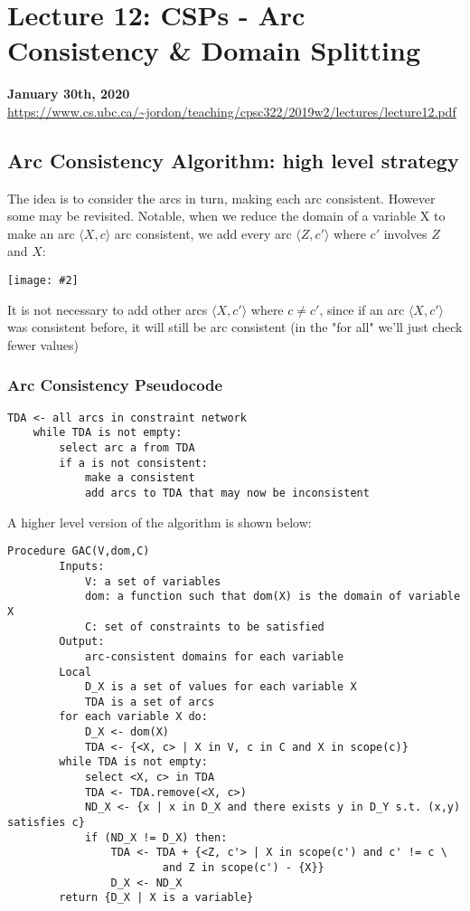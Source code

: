 \documentclass{article}
\theoremstyle{definition}
\newcommand{\centerfig}[2]{\begin{center}\texttt{[image: \#2]}\end{center}}
\begin{document}
\newpage

\section*{Lecture 12: CSPs - Arc Consistency \& Domain Splitting}
\textbf{January 30th, 2020} \\
\url{https://www.cs.ubc.ca/~jordon/teaching/cpsc322/2019w2/lectures/lecture12.pdf}

\subsection*{Arc Consistency Algorithm: high level strategy}
The idea is to consider the arcs in turn, making each arc consistent. However some may be revisited. Notable, when we reduce the domain of a variable X to make an arc $ \langle X, c \rangle $ arc consistent, we add every arc $ \langle Z, c' \rangle $ where $ c' $ involves $ Z $ and $ X $:
\centerfig{0.8}{arc_consistency}
It is not necessary to add other arcs $ \langle X, c' \rangle $ where $ c \ne c' $, since if an arc $ \langle X, c' \rangle $ was consistent before, it will still be arc consistent (in the "for all" we'll just check fewer values)

\subsubsection*{Arc Consistency Pseudocode}
\begin{lstlisting}[tabsize=3]
	TDA <- all arcs in constraint network 
	while TDA is not empty:
		select arc a from TDA
		if a is not consistent:
			make a consistent
			add arcs to TDA that may now be inconsistent
\end{lstlisting}
A higher level version of the algorithm is shown below:

\begin{lstlisting}[tabsize=3]
	Procedure GAC(V,dom,C)
		Inputs:
			V: a set of variables
			dom: a function such that dom(X) is the domain of variable X
			C: set of constraints to be satisfied
		Output:
			arc-consistent domains for each variable
		Local
			D_X is a set of values for each variable X 
			TDA is a set of arcs
		for each variable X do:
			D_X <- dom(X)
			TDA <- {<X, c> | X in V, c in C and X in scope(c)}
		while TDA is not empty:
			select <X, c> in TDA
			TDA <- TDA.remove(<X, c>)
			ND_X <- {x | x in D_X and there exists y in D_Y s.t. (x,y) satisfies c}
			if (ND_X != D_X) then:
				TDA <- TDA + {<Z, c'> | X in scope(c') and c' != c \
						and Z in scope(c') - {X}} 
				D_X <- ND_X
		return {D_X | X is a variable}
\end{lstlisting}
\end{document}
